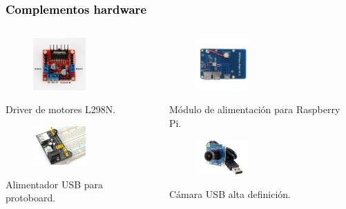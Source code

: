 \documentclass[xcolor=x11names,compress]{beamer}
\theoremstyle{cuadrado}
\begin{document}
\begin{frame}[fragile]
\frametitle{\textcolor{black}{ Complementos hardware}}

\begin{columns}
\begin{column}{0.5\textwidth}
\begin{figure}[H]
  \includegraphics[width=2cm]{l298n.jpg}
\end{figure}
\begin{center}
\caption{Driver de motores L298N.} 
\end{center}

\begin{figure}[H]
  \includegraphics[width=2cm]{alimentador_usb.jpg}
\end{figure}
\begin{center}
\caption{Alimentador USB para protoboard.} 
\end{center}

\end{column}
\begin{column}{0.5\textwidth}
\begin{figure}[H]
  \includegraphics[width=2cm]{modulo-alimentacion.jpg}
\end{figure}
\begin{center}
\caption{Módulo de alimentación para Raspberry Pi.} 
\end{center}

\begin{figure}[H]
  \includegraphics[width=2cm]{camara-usb.jpg}
\end{figure}
\begin{center}
\caption{Cámara USB alta definición.} 
\end{center}
\end{column}
\end{columns}

\end{frame}
\end{document}
